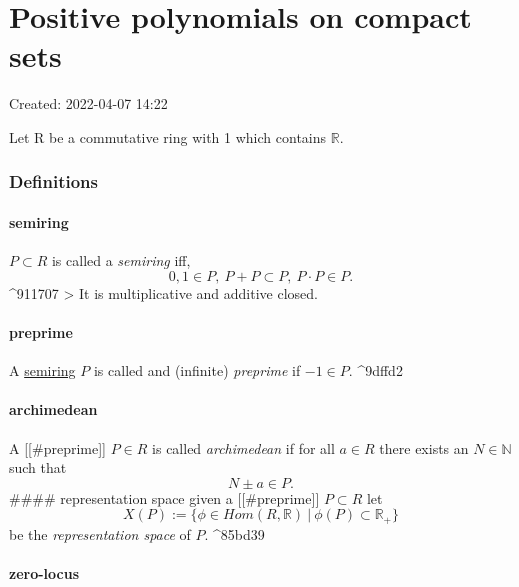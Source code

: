 \documentclass[
]{article}
\author{}
\date{}
\begin{document}
\hypertarget{positive-polynomials-on-compact-sets}{%
\section{Positive polynomials on compact
sets}\label{positive-polynomials-on-compact-sets}}

Created: 2022-04-07 14:22

Let R be a commutative ring with 1 which contains \(\mathbb R\).

\hypertarget{definitions}{%
\subsubsection{Definitions}\label{definitions}}

\hypertarget{semiring}{%
\paragraph{semiring}\label{semiring}}

\(P \subset R\) is called a \emph{semiring} iff,
\[ 0,1 \in P, \ P + P \subset P, \ P \cdot P \in P.\] \^{}911707
\textgreater{} It is multiplicative and additive closed.

\hypertarget{preprime}{%
\paragraph{preprime}\label{preprime}}

A \protect\hyperlink{semiring}{semiring} \(P\) is called and (infinite)
\emph{preprime} if \(-1 \in P\). \^{}9dffd2

\hypertarget{archimedean}{%
\paragraph{archimedean}\label{archimedean}}

A {[}{[}\#preprime{]}{]} \(P \in R\) is called \emph{archimedean} if for
all \(a\in R\) there exists an \(N \in \mathbb N\) such that
\[ N \pm a \in P.\] \#\#\#\# representation space given a
{[}{[}\#preprime{]}{]} \(P \subset R\) let
\[ X(P) := \lbrace \phi \in Hom(R,\mathbb R)  \ \vert \ \phi(P) \subset \mathbb R_+ \rbrace\]
be the \emph{representation space} of \(P\). \^{}85bd39

\hypertarget{zero-locus}{%
\paragraph{zero-locus}\label{zero-locus}}
\end{document}
